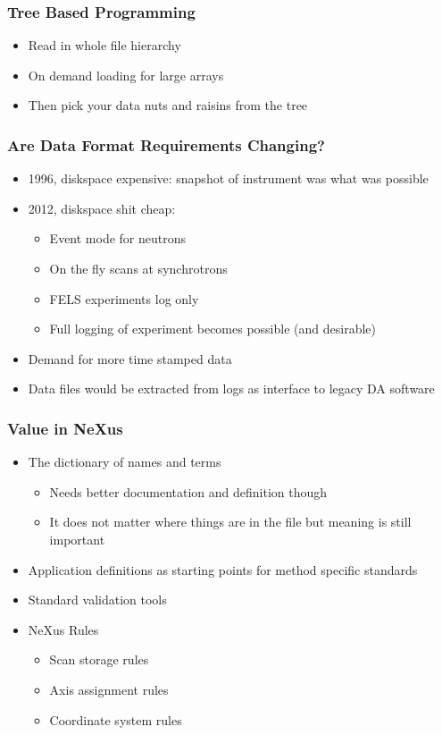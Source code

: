 \documentclass{beamer}
\begin{document}
\begin{frame}
\frametitle{Tree Based Programming}
\begin{itemize}
\item Read in whole file hierarchy
\item On demand loading for large arrays
\item Then pick your data nuts and raisins from the tree
\end{itemize}
\end{frame}

\begin{frame}
\frametitle{Are Data Format Requirements Changing?}
\begin{itemize}
\item 1996, diskspace expensive: snapshot of instrument was what was possible
\item 2012, diskspace shit cheap:
\begin{itemize}
\item Event mode for neutrons
\item On the fly scans at synchrotrons
\item FELS experiments log only
\item Full logging of experiment becomes possible (and desirable)
\end{itemize}
\item Demand for more time stamped data
\item Data files would be extracted from logs as interface to legacy DA software
\end{itemize}
\end{frame}



\begin{frame}
\frametitle{Value in NeXus}
\begin{itemize}
\item The dictionary of names and terms
\begin{itemize}
\item Needs better documentation and definition though
\item It does not matter where things are in the file but meaning is 
 still important
\end{itemize}
\item Application definitions as starting points for method specific standards
\item Standard validation tools
\item NeXus Rules
\begin{itemize}
\item Scan storage rules
\item Axis assignment rules
\item Coordinate system rules
\end{itemize}
\end{itemize}
\end{frame}
\end{document}
